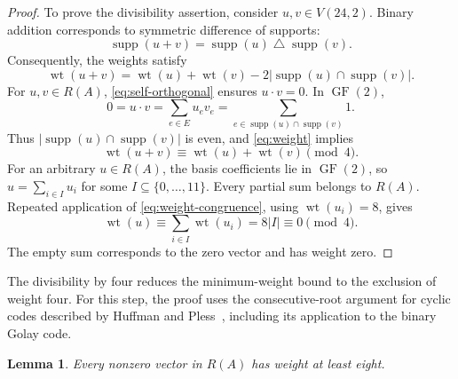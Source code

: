 \documentclass[11pt]{article}
\numberwithin{equation}{section}
\newtheorem{lemma}[lemma]{Lemma}
\DeclareMathOperator{\GF}{GF}
\DeclareMathOperator{\supp}{supp}
\DeclareMathOperator{\wt}{wt}
\begin{document}
\begin{proof}
To prove the divisibility assertion, consider $u,v\in V(24,2)$.
Binary addition corresponds to symmetric difference of supports:
\begin{equation}\label{eq:binary-support}
 \supp(u+v)=\supp(u)\mathbin{\triangle}\supp(v).
\end{equation}
Consequently, the weights satisfy
\begin{equation}\label{eq:weight}
 \wt(u+v)=\wt(u)+\wt(v)-2|\supp(u)\cap\supp(v)|.
\end{equation}
For $u,v\in R(A)$, \eqref{eq:self-orthogonal} ensures $u\cdot v=0$.
In $\GF(2)$,
\[
 0=u\cdot v=\sum_{e\in E}u_ev_e
 =\sum_{e\in\supp(u)\cap\supp(v)}1.
\]
Thus $|\supp(u)\cap\supp(v)|$ is even, and \eqref{eq:weight} implies
\begin{equation}\label{eq:weight-congruence}
 \wt(u+v)\equiv\wt(u)+\wt(v)\pmod4.
\end{equation}
For an arbitrary $u\in R(A)$, the basis coefficients lie in $\GF(2)$,
so $u=\sum_{i\in I}u_i$ for some $I\subseteq\{0,\ldots,11\}$.
Every partial sum belongs to $R(A)$. Repeated application of
\eqref{eq:weight-congruence}, using $\wt(u_i)=8$, gives
\[
 \wt(u)\equiv\sum_{i\in I}\wt(u_i)=8|I|\equiv0\pmod4.
\]
The empty sum corresponds to the zero vector and has weight zero.
\end{proof}

The divisibility by four reduces the minimum-weight bound to the exclusion
of weight four. For this step, the proof uses the consecutive-root argument
for cyclic codes described by Huffman and
Pless~\cite[Theorem~4.5.3 and Example~4.5.5]{HuffmanPless2003}, including its
application to the binary Golay code.

\begin{lemma}\label{lem:weight}
Every nonzero vector in $R(A)$ has weight at least eight.
\end{lemma}
\end{document}
